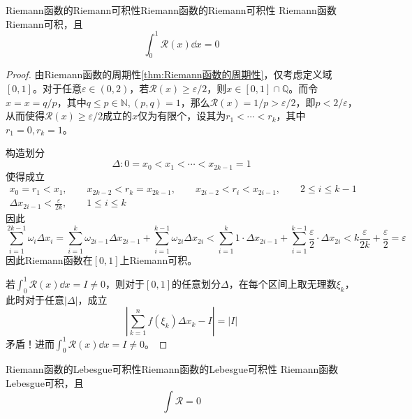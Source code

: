 \documentclass[lang = cn, scheme = chinese, thmcnt = section]{elegantbook}
\newcommand{\N}{\mathbb{N}}            %
\newcommand{\Q}{\mathbb{Q}}            %
\newcommand{\dis}{\displaystyle}
\begin{document}
\begin{theorem}{Riemann函数的Riemann可积性}{Riemann函数的Riemann可积性}
	Riemann函数Riemann可积，且
	$$
	\int_{0}^{1}\mathcal{R}(x)\dd x=0
	$$
\end{theorem}

\begin{proof}
	由Riemann函数的周期性\ref{thm:Riemann函数的周期性}，仅考虑定义域$[0,1]$。对于任意$\varepsilon\in(0,2)$，若$\mathcal{R}(x)\ge\varepsilon/2$，则$x\in[0,1]\cap\Q$。而令$x=x=q/p$，其中$q\le p\in\N,(p,q)=1$，那么$\mathcal{R}(x)=1/p>\varepsilon/2$，即$p<2/\varepsilon$，从而使得$\mathcal{R}(x)\ge\varepsilon/2$成立的$x$仅为有限个，设其为$r_1<\cdots<r_k$，其中$r_1=0,r_k=1$。
	
	构造划分%
	$$
	\Delta:0=x_0<x_1<\cdots<x_{2k-1}=1
	$$
	使得成立
	\begin{gather*}
		x_0=r_1<x_1,\qquad x_{2k-2}<r_k=x_{2k-1},\qquad 
		x_{2i-2}<r_i<x_{2i-1},\qquad 2\le i \le k-1\\
		\Delta x_{2i-1}<\frac{\varepsilon}{2k},\qquad 1\le i \le k
	\end{gather*}
	因此%
	$$
	\sum_{i=1}^{2k-1}\omega_i\Delta x_i
	=\sum_{i=1}^{k}\omega_{2i-1}\Delta x_{2i-1}
	+\sum_{i=1}^{k-1}\omega_{2i}\Delta x_{2i}
	<\sum_{i=1}^{k}1\cdot\Delta x_{2i-1}
	+\sum_{i=1}^{k-1}\frac{\varepsilon}{2}\cdot\Delta x_{2i}
	<k\frac{\varepsilon}{2k}+\frac{\varepsilon}{2}
	=\varepsilon
	$$
	因此Riemann函数在$[0,1]$上Riemann可积。
	
	若$\dis \int_{0}^{1}\mathcal{R}(x)\dd x=I\ne 0$，则对于$[0,1]$的任意划分$\Delta$，在每个区间上取无理数$\xi_k$，此时对于任意$|\Delta|$，成立%
	$$
	\left| \sum_{k=1}^{n}f(\xi_k)\Delta x_k-I \right|
	=|I|
	$$
	矛盾！进而$\dis \int_{0}^{1}\mathcal{R}(x)\dd x=I\ne 0$。
\end{proof}

\begin{theorem}{Riemann函数的Lebesgue可积性}{Riemann函数的Lebesgue可积性}
	Riemann函数Lebesgue可积，且
	$$
	\int \mathcal{R}=0
	$$
\end{theorem}
\end{document}
